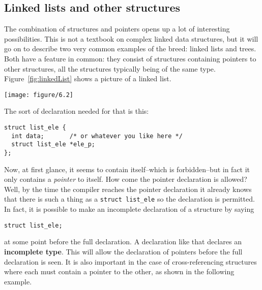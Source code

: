   

  \subsection{Linked lists and other structures}
   

   The combination of structures and pointers opens up a lot of interesting
    possibilities. This is not a textbook on complex linked data structures,
    but it will go on to describe two very common examples of the breed: linked
    lists and trees. Both have a feature in common: they consist of structures
    containing pointers to other structures, all the structures typically being
    of the same type. Figure~\ref{fig:linkedList} shows a picture of a linked
    list.


    \begin{figure*}[htb]\centering
      \texttt{[image: figure/6.2]}
      \caption*{Diagram showing a linked list of three items,
        with a pointer  labelled 'list head' pointing to the first item,
        and each item containing a 'data' value and a 'pointer' value
        which points to the next item (the last pointer is null).}
      \caption{\label{fig:linkedList}List linked by pointers}
    \end{figure*}



   The sort of declaration needed for that is this:


   \begin{Verbatim}
struct list_ele {
  int data;       /* or whatever you like here */
  struct list_ele *ele_p;
};
\end{Verbatim}

   Now, at first glance, it seems to contain itself--which is
    forbidden--but in fact it only contains a \textit{pointer} to itself.
    How come the pointer declaration is allowed? Well, by the time the compiler
    reaches the pointer declaration it already knows that there is such a thing
    as a \texttt{struct list\_ele} so the declaration is permitted. In fact,
    it is possible to make an incomplete declaration of a structure by
    saying


   \begin{Verbatim}
struct list_ele;
\end{Verbatim}

   at some point before the full declaration. A declaration like that
    declares an \textbf{incomplete type}. This will allow the declaration of
    pointers before the full declaration is seen. It is also important in the
    case of cross-referencing structures where each must contain a pointer to
    the other, as shown in the following example.



